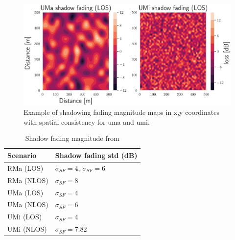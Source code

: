 \begin{figure}
    \centering
    \includegraphics{chapters/part_pathloss/figures/UMaUMiShadowFadingMapLOS.eps}
    \caption{Example of shadowing fading magnitude maps in x,y coordinates with spatial consistency for \gls{uma} and \gls{umi}.}
    \label{fig:uma_umi_shadow_fading_example}
\end{figure}

\begin{table}[b]
\centering
\begin{tabular}{@{}ll@{}}
\toprule
Scenario   & Shadow fading std (dB)               \\ \midrule
RMa (LOS)  & $\sigma_{SF} = 4$, $\sigma_{SF} = 6$ \\
RMa (NLOS) & $\sigma_{SF} = 8$                    \\
UMa (LOS)  & $\sigma_{SF} = 4$                    \\
UMa (NLOS) & $\sigma_{SF} = 6$                    \\
UMi (LOS)  & $\sigma_{SF} = 4$                    \\
UMi (NLOS) & $\sigma_{SF} = 7.82$                 \\ \bottomrule
\end{tabular}
\caption{Shadow fading magnitude from \cite{3GPP38901}}\label{tab:sigma_SF}
\end{table}

